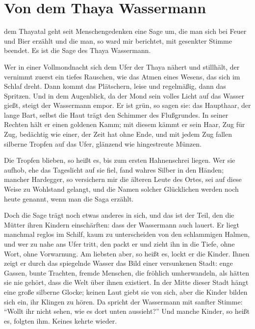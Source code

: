 
\section{Von dem Thaya Wassermann}

 dem Thayatal geht seit Menschengedenken eine Sage um, die man sich bei Feuer und Bier erzählt und die man, so ward mir berichtet, mit gesenkter Stimme beendet. Es ist die Sage des \gls{Thaya Wassermann}.

Wer in einer Vollmondnacht sich dem Ufer der Thaya nähert und stillhält, der vernimmt zuerst ein tiefes Rauschen, wie das Atmen eines Wesens, das sich im Schlaf dreht. Dann kommt das Plätschern, leise und regelmäßig, dann das Spritzen. Und in dem Augenblick, da der Mond sein volles Licht auf das Wasser gießt, steigt der Wassermann empor. Er ist grün, so sagen sie: das Haupthaar, der lange Bart, selbst die Haut trägt den Schimmer des Flußgrundes. In seiner Rechten hält er einen goldenen Kamm; mit diesem kämmt er sein Haar, Zug für Zug, bedächtig wie einer, der Zeit hat ohne Ende, und mit jedem Zug fallen silberne Tropfen auf das Ufer, glänzend wie hingestreute Münzen.

Die Tropfen blieben, so heißt es, bis zum ersten Hahnenschrei liegen. Wer sie aufhob, ehe das Tageslicht auf sie fiel, fand wahres Silber in den Händen; mancher Hardegger, so versichern mir die älteren Leute des Ortes, sei auf diese Weise zu Wohlstand gelangt, und die Namen solcher Glücklichen werden noch heute genannt, wenn man die Saga erzählt.

Doch die Sage trägt noch etwas anderes in sich, und das ist der Teil, den die Mütter ihren Kindern einschärften: dass der Wassermann auch lauert. Er liegt manchmal reglos im Schilf, kaum zu unterscheiden von den schlammigen Halmen, und wer zu nahe ans Ufer tritt, den packt er und zieht ihn in die Tiefe, ohne Wort, ohne Vorwarnung. Am liebsten aber, so heißt es, lockt er die Kinder. Ihnen zeigt er durch das spiegelnde Wasser das Bild einer versunkenen Stadt: enge Gassen, bunte Trachten, fremde Menschen, die fröhlich umherwandeln, als hätten sie nie gehört, dass die Welt über ihnen existiert. In der Mitte dieser Stadt hängt eine große silberne Glocke; keinen Laut giebt sie von sich, aber die Kinder bilden sich ein, ihr Klingen zu hören. Da spricht der Wassermann mit sanfter Stimme: \enquote{Wollt ihr nicht sehen, wie es dort unten aussieht?} Und manche Kinder, so heißt es, folgten ihm. Keines kehrte wieder.

